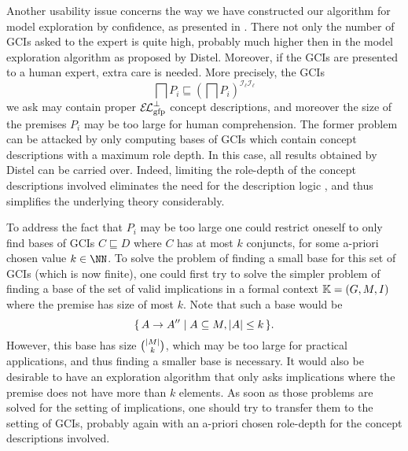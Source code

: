 Another usability issue concerns the way we have constructed our algorithm for model
exploration by confidence, as presented in .  There not only
the number of GCIs asked to the expert is quite high, probably much higher then in the
model exploration algorithm as proposed by Distel.  Moreover, if the GCIs are presented to
a human expert, extra care is needed.  More precisely, the GCIs
\begin{equation*}
  \bigsqcap P_{i} \sqsubseteq (\bigsqcap P_{i})^{\mathcal{I}_{\ell}\mathcal{I}_{\ell}}
\end{equation*}
we ask may contain proper ${{\mathcal{E}\kern-.3ex\mathcal{L}}_\text{gfp}^\bot}$ concept descriptions, and moreover the size of the
premises $P_{i}$ may be too large for human comprehension.  The former problem can be
attacked by only computing bases of GCIs which contain \ELbot concept descriptions with a
maximum role depth.  In this case, all results obtained by Distel can be carried
over.  Indeed, limiting the role-depth of the concept
descriptions involved eliminates the need for the description logic \ELgfpbot, and thus
simplifies the underlying theory considerably.

To address the fact that $P_{i}$ may be too large one could restrict oneself to only find
bases of GCIs $C \sqsubseteq D$ where $C$ has at most $k$ conjuncts, for some a-priori
chosen value $k \in \NN$.  To solve the problem of finding a small base for this set of
GCIs (which is now finite), one could first try to solve the simpler problem of finding a
base of the set of valid implications in a formal context ${\mathbb{K}} = (G, M, I)$ where the
premise has size of most $k$.  Note that such a base would be
\begin{equation*}
  {\ensuremath{\{\, A \to A'' \mid A \subseteq M, \lvert A\rvert \leq k \,\}}}.
\end{equation*}
However, this base has size $\binom{\lvert M\rvert}{k}$, which may be too large for practical
applications, and thus finding a smaller base is necessary.  It would also be desirable to
have an exploration algorithm that only asks implications where the premise does not have
more than $k$ elements.  As soon as those problems are solved for the setting of
implications, one should try to transfer them to the setting of GCIs, probably again with
an a-priori chosen role-depth for the concept descriptions involved.


